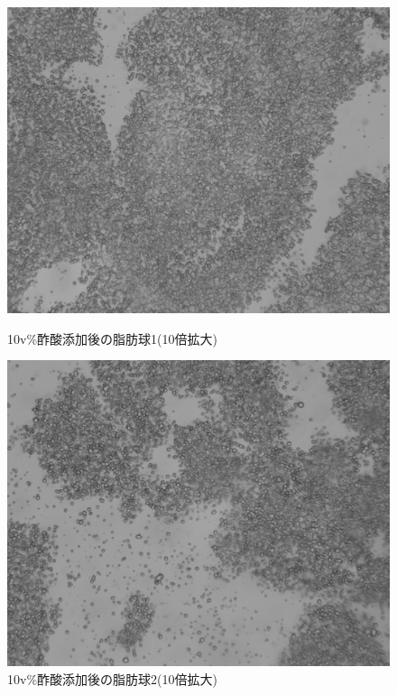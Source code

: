 \documentclass[11pt]{ltjsarticle}
\begin{document}
      \begin{figure}[H]
        \centering
        \begin{minipage}{0.48\textwidth}
          \centering
          \includegraphics[width=\linewidth]{mizumoto_10_1.png}
          \caption{10v\%酢酸添加後の脂肪球1(10倍拡大)}
          \label{fig:milk10_1}
        \end{minipage}
        \hfill
        \begin{minipage}{0.48\textwidth}
          \centering
          \includegraphics[width=\linewidth]{mizumoto_10_2.png}
          \caption{10v\%酢酸添加後の脂肪球2(10倍拡大)}
          \label{fig:milk10_2}
        \end{minipage}
      \end{figure}
\end{document}

